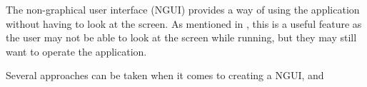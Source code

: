 The non-graphical user interface (NGUI) provides a way of using the application without having to look at the screen. As mentioned in , this is a useful feature as the user may not be able to look at the screen while running, but they may still want to operate the application.

Several approaches can be taken when it comes to creating a NGUI, and 
